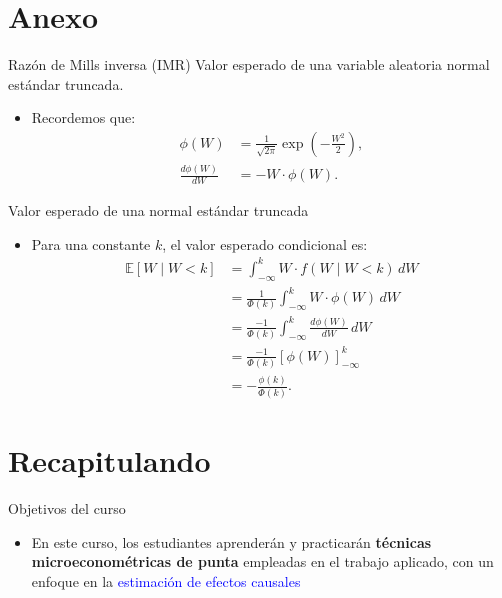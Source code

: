 \documentclass[10pt, xcolor=dvipsnames]{beamer}
\begin{document}
\section{Anexo}

\begin{frame}{Razón de Mills inversa (IMR)}\label{ANEX:IMR}
    Valor esperado de una variable aleatoria normal estándar truncada.
\begin{itemize}
    \item Recordemos que:
    \begin{align*}
        \phi(W) &= \frac{1}{\sqrt{2\pi}} \exp\left(-\frac{W^2}{2}\right), \\[0.3em]
        \frac{d\phi(W)}{dW} &= -W \cdot \phi(W).
    \end{align*}
\end{itemize}
\end{frame}

\begin{frame}{Valor esperado de una normal estándar truncada}\label{ANEX:IMR2}
\begin{itemize}
    \item Para una constante \( k \), el valor esperado condicional es:
    \begin{align*}
        \mathbb{E}[W \mid W < k] 
        &= \int_{-\infty}^{k} W \cdot f(W \mid W < k) \, dW \\
        &= \frac{1}{\Phi(k)} \int_{-\infty}^{k} W \cdot \phi(W) \, dW \\
        &= \frac{-1}{\Phi(k)} \int_{-\infty}^{k} \frac{d\phi(W)}{dW} \, dW \\
        &= \frac{-1}{\Phi(k)} \left[ \phi(W) \right]_{-\infty}^{k} \\
        &= -\frac{\phi(k)}{\Phi(k)}.
    \end{align*}
\end{itemize}
\hyperlink{DIAP:IMR}{{}}
\end{frame}


\section*{Recapitulando}

\begin{frame}{Objetivos del curso}
\begin{itemize}
	\item En este curso, los estudiantes aprenderán y practicarán \textbf{técnicas microeconométricas de punta} empleadas en el trabajo aplicado, con un enfoque en la \textcolor{blue}{estimación de efectos causales}
\end{itemize}
\end{frame}
\end{document}
